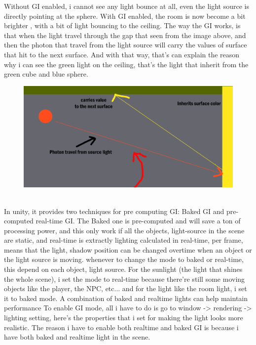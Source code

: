 \documentclass[a4paper, 13pt]{extarticle}
\begin{document}
{\begin{figure}[h]
 \end{figure}
 Without GI enabled, i cannot see any light bounce at all, even the light source is directly pointing at the sphere. With GI enabled, the room is now become a bit brighter , with a bit of light bouncing to the ceiling. The way the GI works, is that when the light travel through the gap that seen from the image above, and then the photon that travel from the light source will carry the values of surface that hit to the next surface. And with that way, that's can explain the reason why i can see the green light on the ceiling, that's the light that inherit from the green cube and blue sphere. 
  \begin{figure}[h]
 	\begin{minipage}{1\textwidth}
 		\centering
 		\includegraphics[width=0.8\linewidth]{intructions/How_light_works.png}
 		\centering
 	\end{minipage}
 \end{figure}
\\[0.05cm]
 In unity, it provides two techniques for pre computing GI: Baked GI and pre-computed real-time GI. The Baked one is pre-computed and will save a ton of processing power, and this only work if all the objects, light-source in the scene are static, and real-time is extractly lighting calculated in real-time, per frame, means that the light, shadow position can be changed overtime when an object or the light source is moving. whenever to change the mode to baked or real-time, this depend on each object, light source. For the sunlight (the light that shines the whole scene), i set the mode to real-time because there're still some moving objects like the player, the NPC, etc... and for the light like the room light, i set it to baked mode. A combination of baked and realtime lights can help maintain performance
 To enable GI mode, all i have to do is go to window -> rendering -> lighting setting, here's the properties that i set for making the light looks more realistic. The reason i have to enable both realtime and baked GI is because i have both baked and realtime light in the scene.
}
\end{document}
